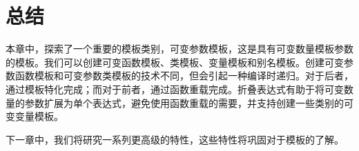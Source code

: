 \section{总结}
本章中，探索了一个重要的模板类别，可变参数模板，这是具有可变数量模板参数的模板。我们可以创建可变函数模板、类模板、变量模板和别名模板。创建可变参数函数模板和可变参数类模板的技术不同，但会引起一种编译时递归。对于后者，通过模板特化完成；而对于前者，通过函数重载完成。折叠表达式有助于将可变数量的参数扩展为单个表达式，避免使用函数重载的需要，并支持创建一些类别的可变变量模板。

下一章中，我们将研究一系列更高级的特性，这些特性将巩固对于模板的了解。